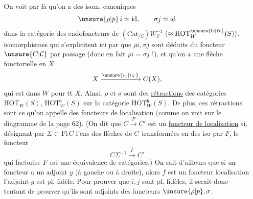 On voit par là qu'on a des isom. canoniques
\[
 \unsure{\rho|p}\,i\simeq\mathrm{id},\qquad \sigma j\simeq\mathrm{id}
\]
dans la catégorie des endofoncteurs de $(\mathrm{Cat}_{/S})W_S^{-1}$ $(\approx\mathrm{HOT}^{\unsure{\mathrm{lc}|\ell\mathrm{c}}}_W(S))$,  isomorphismes qui s'explicitent ici par   que $\rho i,\sigma j$ sont déduits du foncteur $\unsure{C|\mathcal C}$ par passage   (donc en fait $\rho i=\sigma j$ !), et qu'on a une  flèche fonctorielle en $X$
\[
 X\xrightarrow{\unsure{i_x|i_X}}C(X),
\]
qui est dans $W$ pour tt $X$. Ainsi, $\rho$ et $\sigma$ sont  des \uline{rétractions} des  catégories $\mathrm{HOT}_W(S)$, $\mathrm{HOT}_W^\circ(S)$ sur la catégorie $\mathrm{HOT}_W^{\mathrm{lc}}(S)$.  De  plus, ces rétractions sont   ce qu'on appelle des foncteurs de localisation (comme on voit sur le diagramme de la page 62). (On dit que $C\xrightarrow{F}C'$ est un \uline{foncteur de localisation} si, désignant par $\Sigma\subset\mathrm{Fl}\,C$ l'ens des flèches de $C$ transformées en des iso par $F$, le foncteur
\[
 C\Sigma^{-1}\xrightarrow{\overline F}C'
\]
qui factorise $F$ est une équivalence de catégories.)
On sait d'ailleurs que si un foncteur  a un adjoint $g$ (à gauche ou à droite), alors $f$ est un foncteur localisation  l'adjoint $g$ est pl. fidèle. Pour prouver que $i,j$ sont pl. fidèles, il serait donc tentant de prouver qu'ils sont adjoints des foncteurs $\unsure{\rho|p},\sigma$.

